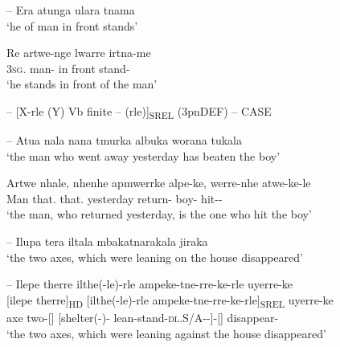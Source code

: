 \documentclass{langscibook}
\begin{document}
\begin{xlist}
\begin{xlist}
\begin{xlist}
--
\ea\label{bkm:Ref340591178}
Era          atunga         ulara        tnama \\
\glt `he             of man         in front    stands' \\
\citep[4]{Kempe1891}

\gll Re          artwe-nge    lwarre    irtna-me \\
3\textsc{sg}.    man-    in{ }front  stand-\\
\glt `he stands in front of the man'
\z


--
\ea{}
[X-rle (Y) Vb finite – (rle)]\textsubscript{SREL} (3pnDEF) – CASE  \\

\z




--
\ea
\label{bkm:Ref339739442}Atua   nala        nana             tmurka       albuka     worana      tukala\\
\glt `the man who went away yesterday has beaten the boy'

\citep[11]{kempe_grammar_1891}

\gll Artwe    nhale,          nhenhe        apmwerrke   alpe-ke,          werre-nhe   atwe-ke-le\\
Man      that.    that.    yesterday     return-   boy-    hit--\\
\glt `the man, who returned yesterday, is the one who hit the boy'
\z

--
\ea
\label{bkm:Ref339787713}Ilupa   tera   iltala    mbakatnarakala   jiraka\\
\glt `the two axes, which were leaning on the house disappeared'

  \citep[11]{kempe_grammar_1891}
\z





--
\ea
Ilepe   therre       ilthe(-le)-rle               ampeke-tne-rre-ke-rle                         uyerre-ke\\
\gll {}[ilepe  therre]\textsubscript{HD}    [ilthe(-le)-rle              ampeke-tne-rre-ke-rle]\textsubscript{SREL}                uyerre-ke\\
     axe   two-[]                        [shelter(-)-           lean-stand-\textsc{dl}.S/A--]-[]  disappear-\\
\glt `the two axes, which were leaning against the house disappeared'
\z






\end{xlist}
\end{xlist}
\end{xlist}
\end{document}
